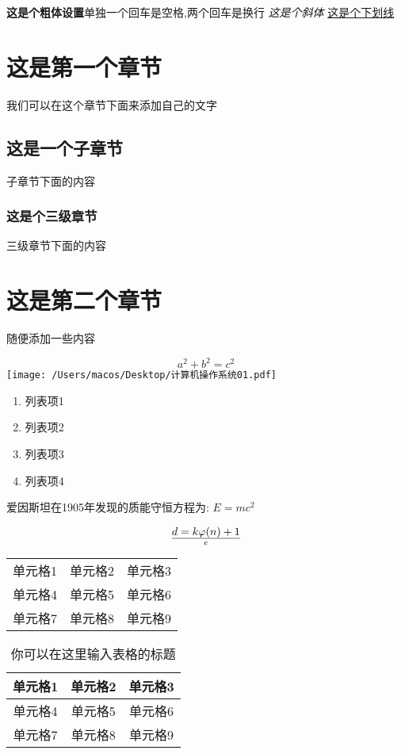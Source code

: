 \documentclass[UTF8]{ctexart}
\begin{document}
\textbf{这是个粗体设置}单独一个回车是空格,两个回车是换行
\textit{这是个斜体}
\underline{这是个下划线}

\section{这是第一个章节}
我们可以在这个章节下面来添加自己的文字

\subsection{这是一个子章节}
子章节下面的内容

\subsubsection{这是个三级章节}
三级章节下面的内容

\section{这是第二个章节}
随便添加一些内容

\begin{equation} %
    a^2+b^2=c^2
\end{equation}
\texttt{[image: /Users/macos/Desktop/计算机操作系统01.pdf]} 

\begin{enumerate}
    \item  列表项1
    \item  列表项2
    \item  列表项3
    \item  列表项4
\end{enumerate}

爱因斯坦在1905年发现的质能守恒方程为: $E=mc^2$

\begin{equation}
    d={k \varphi(n)+1} \over e
\end{equation}


\begin{tabular}{ c c c}
    单元格1 & 单元格2 & 单元格3 \\
    单元格4 & 单元格5 & 单元格6 \\
    单元格7 & 单元格8 & 单元格9 \\
\end{tabular}


\begin{table}
    \center
    \begin{tabular}{ |c |c |c|}
        \hline %
        \hline %
        单元格1 & 单元格2 & 单元格3 \\
        \hline
        单元格4 & 单元格5 & 单元格6 \\
        \hline
        单元格7 & 单元格8 & 单元格9 \\
        \hline
    \end{tabular}
    \caption{你可以在这里输入表格的标题}
\end{table}
\end{document}
